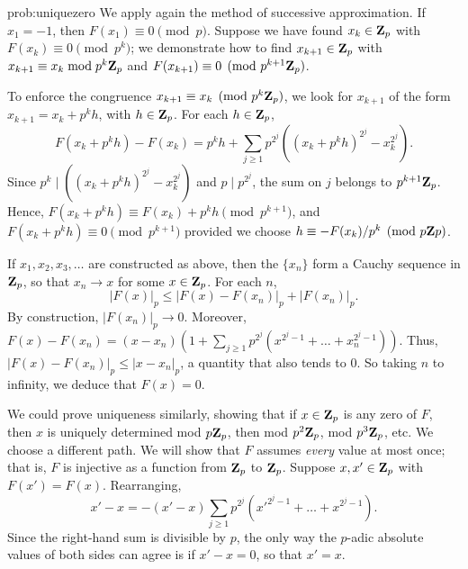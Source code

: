 \begin{sol}{prob:uniquezero} We apply again the method of successive approximation. If $x_1=-1$, then $F(x_1)\equiv 0\pmod{p}$. Suppose we have found $x_k \in \mathbf{Z}_p$ with $F(x_k)\equiv 0\pmod{p^{k}}$; we demonstrate how to find $x_{k+1}\in \mathbf{Z}_p$ with $x_{k+1}\equiv x_k\bmod{p^{k}\mathbf{Z}_p}$ and $F(x_{k+1})\equiv 0\pmod{p^{k+1}\mathbf{Z}_p}$.

To enforce the congruence $x_{k+1}\equiv x_k \pmod{p^k\mathbf{Z}_p}$, we look for $x_{k+1}$ of the form $x_{k+1} = x_k + p^k h$, with $h \in \mathbf{Z}_p$. For each $h \in \mathbf{Z}_p$,
\[ F(x_k + p^k h)- F(x_k) = p^k h + \sum_{j\ge 1} p^{2^j}((x_k+p^k h)^{2^j} - x_k^{2^j}).\]
Since $p^k \mid ((x_k+p^k h)^{2^j} - x_k^{2^j})$ and $p \mid p^{2^j}$, the sum on $j$ belongs to $p^{k+1} \mathbf{Z}_p$.
Hence, $F(x_k+p^k h) \equiv F(x_k) + p^k h \pmod{p^{k+1}}$, and $F(x_k + p^k h)\equiv 0\pmod{p^{k+1}}$ provided we choose $h\equiv -F(x_k)/p^k\pmod{p\mathbf{Z}{p}}$.

If $x_1,x_2,x_3,\dots$ are constructed as above, then the $\{x_n\}$ form a Cauchy sequence in $\mathbf{Z}_p$, so that $x_n\to x$ for some $x \in \mathbf{Z}_p$. For each $n$,
\[ |F(x)|_p \le |F(x)-F(x_n)|_p + |F(x_n)|_p. \]
By construction, $|F(x_n)|_p\to 0$. Moreover, $F(x)-F(x_n) = (x-x_n)(1+ \sum_{j\ge 1}p^{2^{j}}(x^{2^{j}-1} + \dots + x_n^{2^{j}-1}))$. Thus, $|F(x)-F(x_n)|_p \le |x-x_n|_p$, a quantity that also tends to $0$. So taking $n$ to infinity, we deduce that $F(x)=0$.

We could prove uniqueness similarly, showing that if $x \in \mathbf{Z}_p$ is any zero of $F$, then $x$ is uniquely determined mod $p\mathbf{Z}_p$, then mod $p^2\mathbf{Z}_p$, mod $p^3\mathbf{Z}_p$, etc. We choose a different path. We will show that $F$ assumes \emph{every} value at most once; that is, $F$ is injective as a function from $\mathbf{Z}_p$ to $\mathbf{Z}_p$. Suppose $x,x' \in \mathbf{Z}_p$ with $F(x') = F(x)$. Rearranging,
\[ x'-x = -(x'-x)\sum_{j\ge 1}p^{2^j}(x'^{2^{j}-1} + \dots + x^{2^{j}-1}). \]
Since the right-hand sum is divisible by $p$, the only way the $p$-adic absolute values of both sides can agree is if $x'-x=0$, so that $x'=x$.
\end{sol}

